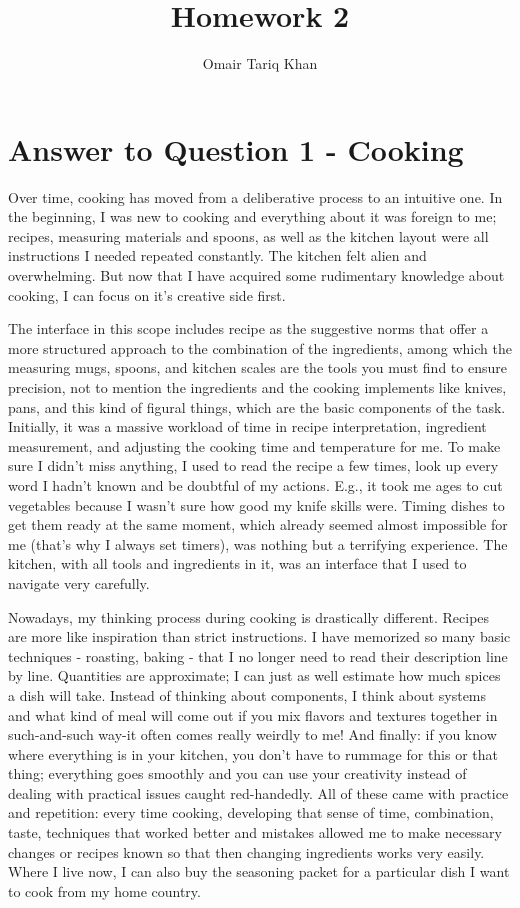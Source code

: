 \documentclass[
	letterpaper, %
]{jdf}
\author{Omair Tariq Khan}
\title{Homework 2}
\begin{document}

\maketitle
\hfill \break
\hfill \break


\section{Answer to Question 1 - Cooking}
Over time, cooking has moved from a deliberative process to an intuitive one. In the beginning, I was new to cooking and everything about it was foreign to me; recipes, measuring materials and spoons, as well as the kitchen layout were all instructions I needed repeated constantly. The kitchen felt alien and overwhelming. But now that I have acquired some rudimentary knowledge about cooking, I can focus on it’s creative side first.

The interface in this scope includes recipe as the suggestive norms that offer a more structured approach to the combination of the ingredients, among which the measuring mugs, spoons, and kitchen scales are the tools you must find to ensure precision, not to mention the ingredients and the cooking implements like knives, pans, and this kind of figural things, which are the basic components of the task. Initially, it was a massive workload of time in recipe interpretation, ingredient measurement, and adjusting the cooking time and temperature for me. To make sure I didn't miss anything, I used to read the recipe a few times, look up every word I hadn't known and be doubtful of my actions. E.g., it took me ages to cut vegetables because I wasn't sure how good my knife skills were. Timing dishes to get them ready at the same moment, which already seemed almost impossible for me (that's why I always set timers), was nothing but a terrifying experience. The kitchen, with all tools and ingredients in it, was an interface that I used to navigate very carefully.

Nowadays, my thinking process during cooking is drastically different. Recipes are more like inspiration than strict instructions. I have memorized so many basic techniques - roasting, baking - that I no longer need to read their description line by line. Quantities are approximate; I can just as well estimate how much spices a dish will take. Instead of thinking about components, I think about systems and what kind of meal will come out if you mix flavors and textures together in such-and-such way-it often comes really weirdly to me! And finally: if you know where everything is in your kitchen, you don't have to rummage for this or that thing; everything goes smoothly and you can use your creativity instead of dealing with practical issues caught red-handedly.  All of these came with practice and repetition: every time cooking, developing that sense of time, combination, taste, techniques that worked better and mistakes allowed me to make necessary changes or recipes known so that then changing ingredients works very easily. Where I live now, I can also buy the seasoning packet for a particular dish I want to cook from my home country. 
\end{document}
